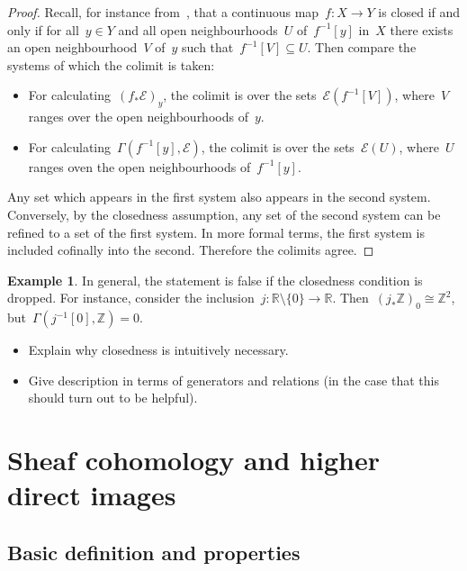 \documentclass[10pt]{amsart}
\theoremstyle{definition}
\newtheorem{ex}[defn]{Example}
\theoremstyle{plain}
\theoremstyle{remark}
\newcommand{\E}{\mathcal{E}}
\newcommand{\ZZ}{\mathbb{Z}}
\newcommand{\RR}{\mathbb{R}}
\begin{document}
\begin{proof}Recall, for instance from~\cite[Lemma~8.10]{wedhorn},
that a continuous map~$f : X \to Y$ is closed if and only if for all~$y \in Y$
and all open neighbourhoods~$U$ of~$f^{-1}[y]$ in~$X$ there exists an open
neighbourhood~$V$ of~$y$ such that~$f^{-1}[V] \subseteq U$. Then compare the
systems of which the colimit is taken:
\begin{itemize}
\item For calculating~$(f_*\E)_y$, the colimit is over the
sets~$\E(f^{-1}[V])$, where~$V$ ranges over the open neighbourhoods of~$y$.
\item For calculating~$\Gamma(f^{-1}[y],\E)$, the colimit is over the
sets~$\E(U)$, where~$U$ ranges oven the open neighbourhoods of~$f^{-1}[y]$.
\end{itemize}
Any set which appears in the first system also appears in the second system.
Conversely, by the closedness assumption, any set of the second system can be
refined to a set of the first system. In more formal terms, the first system is
included cofinally into the second. Therefore the colimits agree.
\end{proof}

\begin{ex}In general, the statement is false if the closedness condition is
dropped. For instance, consider the inclusion~$j : \RR \setminus \{0\} \to \RR$.
Then~$(j_* \ZZ)_0 \cong \ZZ^2$, but~$\Gamma(j^{-1}[0],\ZZ) = 0$.\end{ex}

\begin{itemize}
\item Explain why closedness is intuitively necessary.
\item Give description in terms of generators and relations (in the case that
this should turn out to be helpful).
\end{itemize}


\section{Sheaf cohomology and higher direct images}

\subsection{Basic definition and properties}
\end{document}
